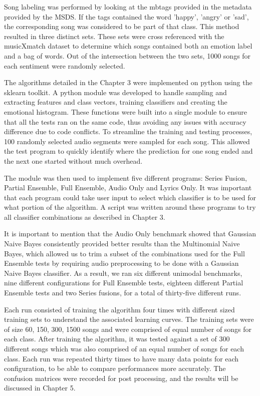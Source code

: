 Song labeling was performed by looking at the mbtags provided in the metadata provided by the MSDS. If the tags contained the word 'happy', 'angry' or 'sad', the corresponding song was considered to be part of that class. This method resulted in three distinct sets. These sets were cross referenced with the musicXmatch dataset to determine which songs contained both an emotion label and a bag of words.   Out of the intersection between the two sets, 1000 songs for each sentiment were randomly selected.

The algorithms detailed in the Chapter 3 were implemented on python using the sklearn toolkit\protect\footnotemark.   A python module was developed to handle sampling and extracting features and class vectors, training classifiers and creating the emotional histogram.  These functions were built into a single module to ensure that all the tests ran on the same code, thus avoiding any issues with accuracy difference due to code conflicts. To streamline the training and testing processes, 100 randomly selected audio segments were sampled for each song. This allowed the test program to quickly identify where the prediction for one song ended and the next one started without much overhead.

The module was then used to implement five different programs: Series Fusion, Partial Ensemble, Full Ensemble, Audio Only and Lyrics Only.  It was important that each program could take user input to select which classifier is to be used for what portion of the algorithm.  A script was written around these programs to try all classifier combinations as described in Chapter 3. 

It is important to mention that the Audio Only benchmark showed that Gaussian Naive Bayes consistently provided better results than the Multinomial Naive Bayes, which allowed us to trim a subset of the combinations used for the Full Ensemble tests by requiring audio preprocessing to be done with a Gaussian Naive Bayes classifier. As a result, we ran six different unimodal benchmarks, nine different configurations for Full Ensemble tests, eighteen different Partial Ensemble tests and two Series fusions, for a total of thirty-five different runs. 


Each run consisted of training the algorithm four times with different sized training sets to understand the associated learning curves. The training sets were of size 60, 150, 300, 1500 songs and were comprised of equal number of songs for each class.  After training the algorithm, it was tested against a set of 300 different songs which was also comprised of an equal number of songs for each class. Each run was repeated thirty times to have many data points for each configuration, to be able to compare performances more accurately.  The confusion matrices were recorded for post processing, and the results will be discussed in Chapter 5. 

